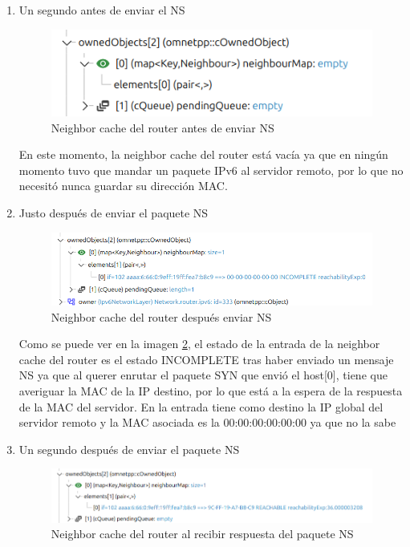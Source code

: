 \begin{enumerate}
    \item Un segundo antes de enviar el NS
    
    \begin{figure}[H]
        \centering
        \includegraphics[width=135mm, scale=0.75]{imaxes/captura_ejer4_33.png}
        \caption{Neighbor cache del router antes de enviar NS}
        \label{fig:paquete_antes_t6}
    \end{figure}

    En este momento, la neighbor cache del router está vacía ya que en ningún momento tuvo que mandar un paquete IPv6 al servidor remoto, por lo que no necesitó nunca guardar su dirección MAC.

    \item Justo después de enviar el paquete NS
    
    \begin{figure}[H]
        \centering
        \includegraphics[width=135mm, scale=0.75]{imaxes/captura_ejer4_31.png}
        \caption{Neighbor cache del router después enviar NS}
        \label{fig:paquete_ns_t6}
    \end{figure}

   Como se puede ver en la imagen \ref{fig:paquete_ns_t6}, el estado de la entrada de la neighbor cache del router es el estado INCOMPLETE tras haber enviado un mensaje NS ya que al querer enrutar el paquete SYN que envió el host[0], tiene que averiguar la MAC de la IP destino, por lo que está a la espera de la respuesta de la MAC del servidor. En la entrada tiene como destino la IP global del servidor remoto y la MAC asociada es la 00:00:00:00:00:00 ya que no la sabe

    \item Un segundo después de enviar el paquete NS
    \begin{figure}[H]
        \centering
        \includegraphics[width=135mm, scale=0.75]{imaxes/captura_ejer4_32.png}
        \caption{Neighbor cache del router al recibir respuesta del paquete NS}
        \label{fig:respuesta_ns_t6}
    \end{figure}


\end{enumerate}
